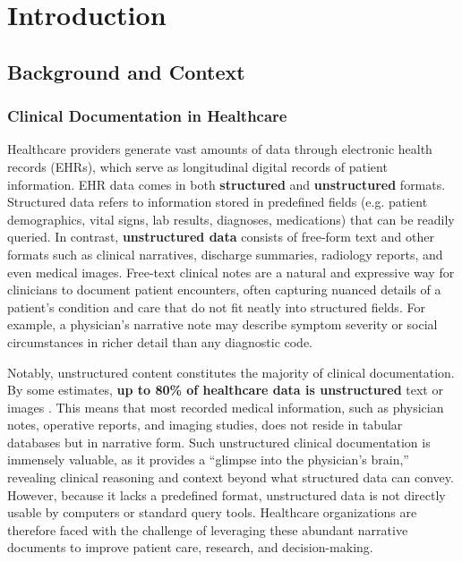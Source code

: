 
\chapter{Introduction} %

\label{Chapter1} %


\newcommand{\keyword}[1]{\textbf{#1}}
\newcommand{\tabhead}[1]{\textbf{#1}}
\newcommand{\code}[1]{\texttt{#1}}
\newcommand{\file}[1]{\texttt{\bfseries#1}}
\newcommand{\option}[1]{\texttt{\itshape#1}}


\section{Background and Context}

\subsection{Clinical Documentation in Healthcare}

Healthcare providers generate vast amounts of data through electronic health records (EHRs), which serve as longitudinal digital records of patient information. EHR data comes in both \textbf{structured} and \textbf{unstructured} formats. Structured data refers to information stored in predefined fields (e.g. patient demographics, vital signs, lab results, diagnoses, medications) that can be readily queried. In contrast, \textbf{unstructured data} consists of free-form text and other formats such as clinical narratives, discharge summaries, radiology reports, and even medical images. Free-text clinical notes are a natural and expressive way for clinicians to document patient encounters, often capturing nuanced details of a patient's condition and care that do not fit neatly into structured fields. For example, a physician's narrative note may describe symptom severity or social circumstances in richer detail than any diagnostic code.

Notably, unstructured content constitutes the majority of clinical documentation. By some estimates, \textbf{up to 80\% of healthcare data is unstructured} text or images \parencite{Kong2019}. This means that most recorded medical information, such as physician notes, operative reports, and imaging studies, does not reside in tabular databases but in narrative form. Such unstructured clinical documentation is immensely valuable, as it provides a ``glimpse into the physician's brain,'' revealing clinical reasoning and context beyond what structured data can convey. However, because it lacks a predefined format, unstructured data is not directly usable by computers or standard query tools. Healthcare organizations are therefore faced with the challenge of leveraging these abundant narrative documents to improve patient care, research, and decision-making.


